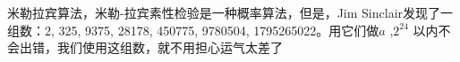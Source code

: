 米勒拉宾算法，米勒-拉宾素性检验是一种概率算法，但是，Jim Sinclair发现了一组数：2, 325, 9375, 28178, 450775, 9780504, 1795265022。用它们做$a$ ,$2^{24}$ 以内不会出错，我们使用这组数，就不用担心运气太差了